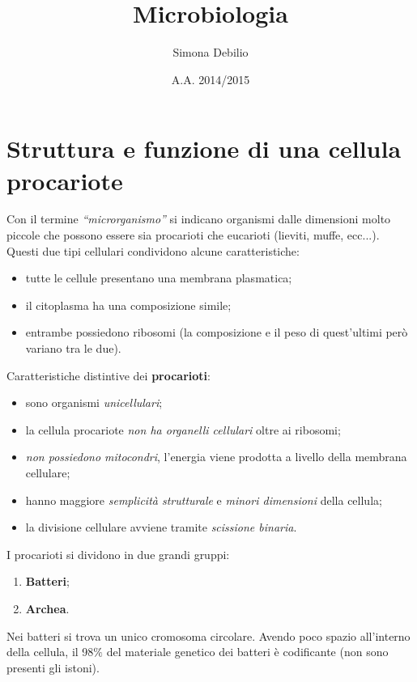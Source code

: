 \documentclass[11pt]{book}
\title{\textbf{Microbiologia}}
\author{Simona Debilio}
\date{A.A. 2014/2015}
\begin{document}
\maketitle

\tableofcontents

\chapter{Struttura e funzione di una cellula procariote}

Con il termine \emph{``microrganismo''} si indicano organismi dalle dimensioni molto piccole che possono essere sia procarioti che eucarioti (lieviti, muffe, ecc...).
Questi due tipi cellulari condividono alcune caratteristiche:
\begin{itemize}
\item tutte le cellule presentano una membrana plasmatica;
\item il citoplasma ha una composizione simile;
\item entrambe possiedono ribosomi (la composizione e il peso di quest'ultimi però variano tra le due).
\end{itemize}
\vspace{1em}
Caratteristiche distintive dei \textbf{procarioti}:
\begin{itemize}
\item sono organismi \emph{unicellulari};
\item la cellula procariote \emph{non ha organelli cellulari} oltre ai ribosomi;
\item \emph{non possiedono mitocondri}, l'energia viene prodotta a livello della membrana cellulare;
\item hanno maggiore \emph{semplicità strutturale} e \emph{minori dimensioni} della cellula;
\item la divisione cellulare avviene tramite \emph{scissione binaria}.
\end{itemize} 
\vspace{1em}
I procarioti si dividono in due grandi gruppi:
\begin{enumerate}
\item \textbf{Batteri};
\item \textbf{Archea}.
\end{enumerate}
\vspace{1em}
Nei batteri si trova un unico cromosoma circolare.
Avendo poco spazio all'interno della cellula, il 98$\%$  del materiale genetico dei batteri è codificante (non sono presenti gli istoni).
\end{document}
